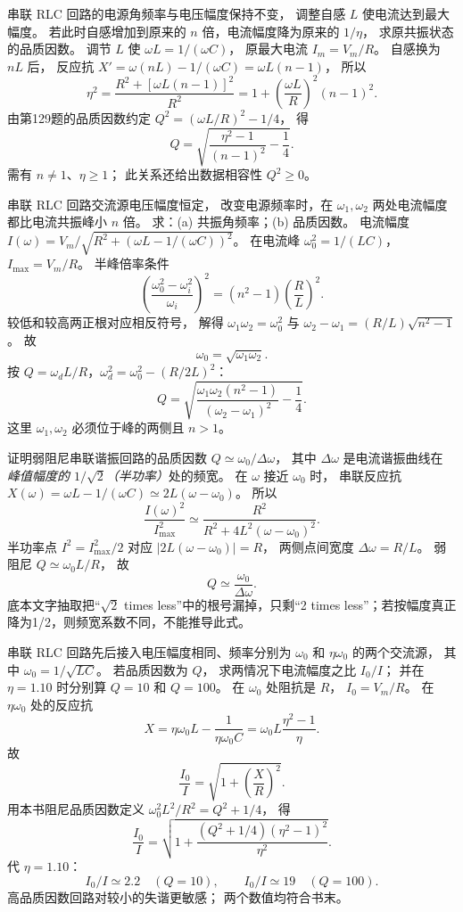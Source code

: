 串联 RLC 回路的电源角频率与电压幅度保持不变，
调整自感 $L$ 使电流达到最大幅度。
若此时自感增加到原来的 $n$ 倍，电流幅度降为原来的 $1/\eta$，
求原共振状态的品质因数。
\exsolution
调节 $L$ 使
$\omega L=1/(\omega C)$，
原最大电流 $I_m=V_m/R$。
自感换为 $nL$ 后，
反应抗
$X'=\omega(nL)-1/(\omega C)
=\omega L(n-1)$，
所以
\[
\eta^2=
\frac{R^2+[\omega L(n-1)]^2}{R^2}
=1+\left(\frac{\omega L}{R}\right)^2(n-1)^2.
\]
由第129题的品质因数约定
$Q^2=(\omega L/R)^2-1/4$，
得
\[
\boxed{Q=
\sqrt{\frac{\eta^2-1}{(n-1)^2}-\frac14}}.
\]
\excheck 需有 $n\ne1$、$\eta\ge1$；
此关系还给出数据相容性 $Q^2\ge0$。

串联 RLC 回路交流源电压幅度恒定，
改变电源频率时，在
$\omega_1,\omega_2$ 两处电流幅度都比电流共振峰小 $n$ 倍。
求：(a) 共振角频率；(b) 品质因数。
\exsolution
电流幅度
$I(\omega)=V_m/\sqrt{R^2+(\omega L-1/(\omega C))^2}$。
在电流峰 $\omega_0^2=1/(LC)$，
$I_{\max}=V_m/R$。
半峰倍率条件
\[
\left(\frac{\omega_0^2-\omega_i^2}{\omega_i}\right)^2
=(n^2-1)\left(\frac RL\right)^2.
\]
较低和较高两正根对应相反符号，
解得
$\omega_1\omega_2=\omega_0^2$ 与
$\omega_2-\omega_1=(R/L)\sqrt{n^2-1}$。
故
\[
\boxed{\omega_0=\sqrt{\omega_1\omega_2}}.
\]
按 $Q=\omega_dL/R$，$\omega_d^2=\omega_0^2-(R/2L)^2$：
\[
\boxed{Q=
\sqrt{\frac{\omega_1\omega_2(n^2-1)}
{(\omega_2-\omega_1)^2}-\frac14}}.
\]
\excheck 这里 $\omega_1,\omega_2$ 必须位于峰的两侧且 $n>1$。

证明弱阻尼串联谐振回路的品质因数
$Q\simeq\omega_0/\Delta\omega$，
其中 $\Delta\omega$ 是电流谐振曲线在
\emph{峰值幅度的 $1/\sqrt2$（半功率）}处的频宽。
\exsolution
在 $\omega$ 接近 $\omega_0$ 时，
串联反应抗
$X(\omega)=\omega L-1/(\omega C)
\simeq2L(\omega-\omega_0)$。
所以
\[
\frac{I(\omega)^2}{I_{\max}^2}
\simeq\frac{R^2}{R^2+
4L^2(\omega-\omega_0)^2}.
\]
半功率点
$I^2=I_{\max}^2/2$
对应
$|2L(\omega-\omega_0)|=R$，
两侧点间宽度
$\Delta\omega=R/L$。
弱阻尼
$Q\simeq\omega_0L/R$，
故
\[
\boxed{Q\simeq\frac{\omega_0}{\Delta\omega}}.
\]
\excheck 底本文字抽取把“$\sqrt2$ times less”中的根号漏掉，只剩“2 times less”；若按幅度真正降为1/2，则频宽系数不同，不能推导此式。

串联 RLC 回路先后接入电压幅度相同、频率分别为
$\omega_0$ 和 $\eta\omega_0$ 的两个交流源，
其中 $\omega_0=1/\sqrt{LC}$。
若品质因数为 $Q$，
求两情况下电流幅度之比 $I_0/I$；
并在 $\eta=1.10$ 时分别算
$Q=10$ 和 $Q=100$。
\exsolution
在 $\omega_0$ 处阻抗是 $R$，
$I_0=V_m/R$。
在 $\eta\omega_0$ 处的反应抗
\[
X=\eta\omega_0L-\frac1{\eta\omega_0C}
=\omega_0L\frac{\eta^2-1}{\eta}.
\]
故
\[
\frac{I_0}{I}=
\sqrt{1+\left(\frac X R\right)^2}.
\]
用本书阻尼品质因数定义
$\omega_0^2L^2/R^2=Q^2+1/4$，
得
\[
\boxed{\frac{I_0}{I}=
\sqrt{1+\frac{(Q^2+1/4)(\eta^2-1)^2}{\eta^2}}}.
\]
代 $\eta=1.10$：
\[
\boxed{I_0/I\simeq2.2\quad(Q=10)},\qquad
\boxed{I_0/I\simeq19\quad(Q=100)}.
\]
\excheck 高品质因数回路对较小的失谐更敏感；
两个数值均符合书末。

